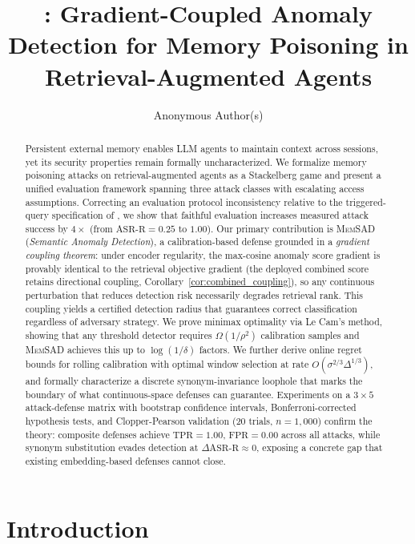 \documentclass{article}
\title{\texorpdfstring{\memsad{}}{MemSAD}: Gradient-Coupled Anomaly Detection for Memory Poisoning in Retrieval-Augmented Agents}
\author{Anonymous Author(s)}
\theoremstyle{definition}
\newcommand{\asrr}{\text{ASR-R}}
\newcommand{\tpr}{\text{TPR}}
\newcommand{\fpr}{\text{FPR}}
\newcommand{\memsad}{\textnormal{\textsc{MemSAD}}}
\begin{document}
\maketitle

\begin{abstract}
Persistent external memory enables LLM agents to maintain context across sessions, yet its security properties remain formally uncharacterized. We formalize memory poisoning attacks on retrieval-augmented agents as a Stackelberg game and present a unified evaluation framework spanning three attack classes with escalating access assumptions. Correcting an evaluation protocol inconsistency relative to the triggered-query specification of \citet{chen2024agentpoison}, we show that faithful evaluation increases measured attack success by $4\times$ (from $\asrr = 0.25$ to $1.00$). Our primary contribution is \memsad{} (\emph{Semantic Anomaly Detection}), a calibration-based defense grounded in a \emph{gradient coupling theorem}: under encoder regularity, the max-cosine anomaly score gradient is provably identical to the retrieval objective gradient (the deployed combined score retains directional coupling, Corollary~\ref{cor:combined_coupling}), so any continuous perturbation that reduces detection risk necessarily degrades retrieval rank. This coupling yields a certified detection radius that guarantees correct classification regardless of adversary strategy. We prove minimax optimality via Le Cam's method, showing that any threshold detector requires $\Omega(1/\rho^2)$ calibration samples and \memsad{} achieves this up to $\log(1/\delta)$ factors. We further derive online regret bounds for rolling calibration with optimal window selection at rate $O(\sigma^{2/3}\Delta^{1/3})$, and formally characterize a discrete synonym-invariance loophole that marks the boundary of what continuous-space defenses can guarantee. Experiments on a $3 \times 5$ attack-defense matrix with bootstrap confidence intervals, Bonferroni-corrected hypothesis tests, and Clopper-Pearson validation (20 trials, $n=1{,}000$) confirm the theory: composite defenses achieve $\tpr = 1.00$, $\fpr = 0.00$ across all attacks, while synonym substitution evades detection at $\Delta\asrr \approx 0$, exposing a concrete gap that existing embedding-based defenses cannot close.
\end{abstract}

\section{Introduction}
\label{sec:intro}
\end{document}
